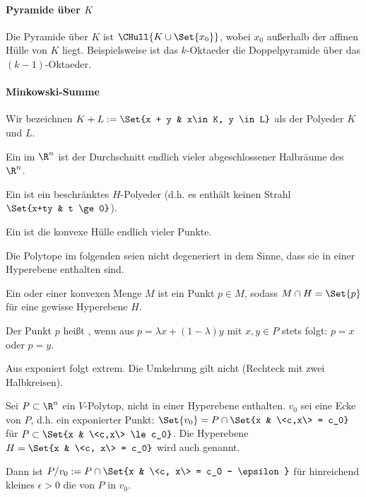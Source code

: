 \paragraph{Pyramide über $K$}
Die Pyramide über $K$ ist $\CHull{K \cup \Set{x_0}}$, wobei $x_0$ außerhalb der affinen Hülle von $K$ liegt.
Beispielsweise ist das $k$-Oktaeder die Doppelpyramide über das $(k-1)$-Oktaeder.

\paragraph{Minkowski-Summe}
Wir bezeichnen
\begin{math}
    K + L := \Set{x + y & x\in K, y \in L}
\end{math}
als  der Polyeder $K$ und $L$.

\begin{df}
    Ein  im $\R^n$ ist der Durchschnitt endlich vieler abgeschlossener Halbräume des $\R^n$.

    Ein  ist ein beschränktes $H$-Polyeder (d.h. es enthält keinen Strahl $\Set{x+ty & t \ge 0}$).
\end{df}

\begin{df}[$V$-Polytop]
    Ein  ist die konvexe Hülle endlich vieler Punkte.
\end{df}

Die Polytope im folgenden seien nicht degeneriert in dem Sinne, dass sie in einer Hyperebene enthalten sind.

\begin{df}
    Ein  oder  einer konvexen Menge $M$ ist ein Punkt $p \in M$, sodass $M \cap H = \Set{p}$ für eine gewisse Hyperebene $H$.

    Der Punkt $p$ heißt , wenn aus $p = \lambda x + (1-\lambda)y$ mit $x,y \in P$ stets folgt: $p = x$ oder $p = y$.
    \begin{note}
        Aus exponiert folgt extrem.
        Die Umkehrung gilt nicht (Rechteck mit zwei Halbkreisen).
    \end{note}
\end{df}

\begin{df}[Eckenfigur]
    Sei $P \subset \R^n$ ein $V$-Polytop, nicht in einer Hyperebene enthalten.
    $v_0$ sei eine Ecke von $P$, d.h. ein exponierter Punkt:
    \begin{math}
        \Set{v_0} =
        P \cap \Set{x & \<c,x\> = c_0}
    \end{math}
    für $P \subset \Set{x & \<c,x\> \le c_0}$.
    Die Hyperebene $H = \Set{x & \<c, x\> = c_0}$ wird auch  genannt.

    Dann ist $P / v_0 := P \cap \Set{x & \<c, x\> = c_0 - \epsilon}$ für hinreichend kleines $\epsilon > 0$ die  von $P$ in $v_0$.
\end{df}

